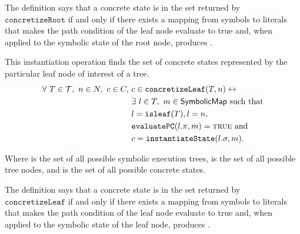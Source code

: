 The definition says that a concrete state \concstate{} is in the set returned by
$\mathtt{concretizeRoot}$ if and only if there exists a mapping from symbols to
literals that makes the path condition of the leaf node evaluate to true
and, when applied to the symbolic state of the root node, produces
\concstate{}. 

\begin{mydefinition}
  \label{def:concleaf}

  This instantiation operation finds the set of concrete states represented by
  the particular leaf node of interest of a tree.
  \begin{align*}
\forall ~T \in \mathcal{T},~n \in N,~c \in C,~& c \in
\mathtt{concretizeLeaf}(T,n) \leftrightarrow \\
&\exists~ l \in T,~ m \in \textsf{SymbolicMap} \mathrm{~such~that}\\
&l = \mathtt{isleaf}(T), l = n,\\
&\mathtt{evaluatePC}(l.\pi, m) = \mathtt{\textsc{true}}~\mathrm{and}  \\
&c = \mathtt{instantiateState}(l.\sigma, m).
    \end{align*}
\end{mydefinition}



Where \trees{} is the set of all possible symbolic execution trees, \nodes{} is
the set of all possible tree nodes, and
\concstates{} is the set of all possible concrete states.


The definition says that a concrete state \concstate{} is in the set returned by
$\mathtt{concretizeLeaf}$ if and only if there exists a mapping from symbols to
literals that makes the path condition of the leaf node evaluate to true and,
when applied to the symbolic state of the leaf node, produces \concstate{}.

